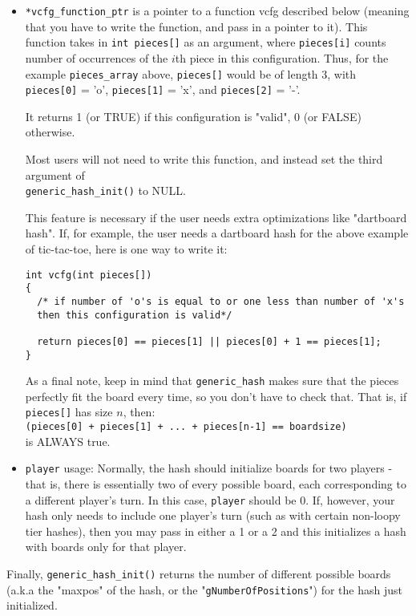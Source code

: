 \documentclass[11pt]{article}
\begin{document}
\begin{itemize}
\item \texttt{*vcfg\_function\_ptr} is a pointer to a function vcfg described below (meaning that you have to write the function, and pass in a pointer to it).
This function takes in \texttt{int pieces[]} as an argument, where \texttt{pieces[i]} counts number of occurrences of the $i$th piece in this configuration.
Thus, for the example \texttt{pieces\_array} above, \texttt{pieces[]} would be of length 3, with \texttt{pieces[0]} = 'o', \texttt{pieces[1]} = 'x', and \texttt{pieces[2]} = '-'.

It returns 1 (or TRUE) if this configuration is "valid", 0 (or FALSE) otherwise.

Most users will not need to write this function, and instead set the third argument of \\\texttt{generic\_hash\_init()} to NULL.

This feature is necessary if the user needs extra optimizations like "dartboard hash".
If, for example, the user needs a dartboard hash for the above example of tic-tac-toe, here is one way to write it:

\begin{verbatim}
int vcfg(int pieces[])
{
  /* if number of 'o's is equal to or one less than number of 'x's
  then this configuration is valid*/
 
  return pieces[0] == pieces[1] || pieces[0] + 1 == pieces[1];
}
\end{verbatim}

As a final note, keep in mind that \texttt{generic\_hash} makes sure that the pieces perfectly fit the board every time, so you don't have to check that.
That is, if \texttt{pieces[]} has size $n$, then:\\
\texttt{(pieces[0] + pieces[1] + ... + pieces[n-1] == boardsize)}\\
is ALWAYS true.

\item \texttt{player} usage: Normally, the hash should initialize boards for two players - that is, there is essentially two of every possible board, each corresponding to a different player's turn. In this case, \texttt{player} should be 0. If, however, your hash only needs to include one player's turn (such as with certain non-loopy tier hashes), then you may pass in either a 1 or a 2 and this initializes a hash with boards only for that player.
\end{itemize}

Finally, \texttt{generic\_hash\_init()} returns the number of different possible boards (a.k.a the "maxpos" of the hash, or the "\texttt{gNumberOfPositions}") for the hash just initialized.
\end{document}
